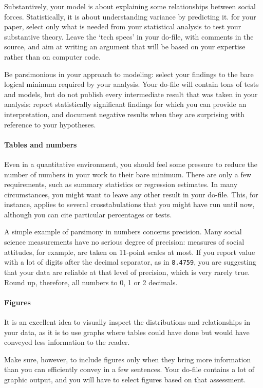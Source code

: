 Substantively, your model is about explaining some relationships between social forces. Statistically, it is about understanding variance by predicting it. for your paper, select only what is needed from your statistical analysis to test your substantive theory. Leave the `tech specs' in your do-file, with comments in the source, and aim at writing an argument that will be based on your expertise rather than on computer code.%

  Be parsimonious in your approach to modeling: select your findings to the bare logical minimum required by your analysis. Your do-file will contain tons of tests and models, but do not publish every intermediate result that was taken in your analysis: report statistically significant findings for which you can provide an interpretation, and document negative results when they are surprising with reference to your hypotheses.%

\paragraph{Tables and numbers} Even in a quantitative environment, you should feel some pressure to reduce the number of numbers in your work to their bare minimum. There are only a few requirements, such as summary statistics or regression estimates. In many circumstances, you might want to leave any other result in your do-file. This, for instance, applies to several crosstabulations that you might have run until now, although you can cite particular percentages or tests.%

  A simple example of parsimony in numbers concerns precision. Many social science measurements have no serious degree of precision: measures of social attitudes, for example, are taken on 11-point scales at most. If you report value with a lot of digits after the decimal separator, as in \texttt{8.4759}, you are suggesting that your data are reliable at that level of precision, which is very rarely true. Round up, therefore, all numbers to 0, 1 or 2 decimals.%

\paragraph{Figures} It is an excellent idea to visually inspect the distributions and relationships in your data, as it is to use graphs where tables could have done but would have conveyed less information to the reader.%

  Make sure, however, to include figures only when they bring more information than you can efficiently convey in a few sentences. Your do-file contains a lot of graphic output, and you will have to select figures based on that assessment.%

